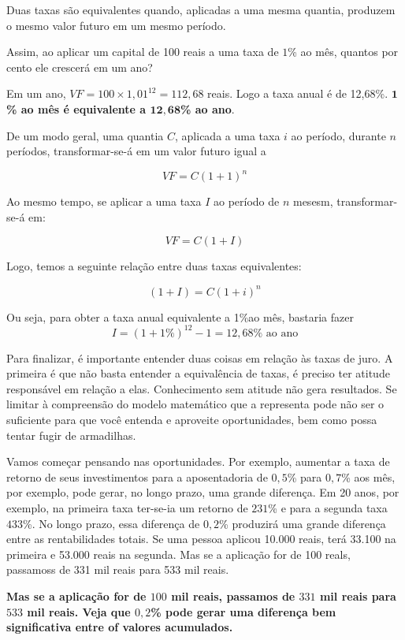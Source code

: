 \label{fin-arg-6}

Duas taxas são equivalentes quando, aplicadas a uma mesma quantia, produzem o mesmo valor futuro em um mesmo período.

Assim, ao aplicar um capital de 100 reais a uma taxa de $1$\% ao mês, quantos por cento ele crescerá em um ano?

Em um ano, $\mathit{VF} = 100\times 1{,}01^{12} = 112{,}68$ reais. Logo a taxa anual é de 12,68\%. \textbf{$\bm{1}$\% ao mês é equivalente a $\bm{12,68}$\% ao ano}.

De um modo geral, uma quantia $C$, aplicada a uma taxa $i$ ao período, durante $n$ períodos, transformar-se-á em um valor futuro igual a 

$$\mathit{VF}=C(1+1)^n$$

Ao mesmo tempo, se aplicar a uma taxa $I$ ao período de $n$ mesesm, transformar-se-á em:

$$\mathit{VF}=C(1+I)$$

Logo, temos a seguinte relação entre duas taxas equivalentes:

$$(1+I)=C(1+i)^n$$

Ou seja, para obter a taxa anual equivalente a 1\%ao mês, bastaria fazer
$$I=(1+1\%)^{12}-1=12{,}68\% \text{ ao ano}$$

Para finalizar, é importante entender duas coisas em relação às taxas de juro. A primeira é que não basta entender a equivalência de taxas, é preciso ter atitude responsável em relação a elas. Conhecimento sem atitude não gera resultados. Se limitar à compreensão do modelo matemático que a representa pode não ser o suficiente para que você entenda e aproveite oportunidades, bem como possa tentar fugir de armadilhas.

Vamos começar pensando nas oportunidades. Por exemplo, aumentar a taxa de retorno de seus investimentos para a aposentadoria de $0{,}5$\% para $0{,}7$\% aos mês, por exemplo, pode gerar, no longo prazo, uma grande diferença. Em 20 anos, por exemplo, na primeira taxa ter-se-ia um retorno de $231$\% e para a segunda taxa $433$\%. No longo prazo, essa diferença de $0{,}2$\% produzirá uma grande diferença entre as rentabilidades totais. Se uma pessoa aplicou 10.000 reais, terá 33.100 na primeira e 53.000 reais na segunda. Mas se a aplicação for de 100 reals, passamoss de 331 mil reais para 533 mil reais. 

\textbf{Mas se a aplicação for de $100$ mil reais, passamos de $331$ mil reais para $533$ mil reais. Veja que $0{,}2$\% pode gerar uma diferença bem significativa entre of valores acumulados.}

